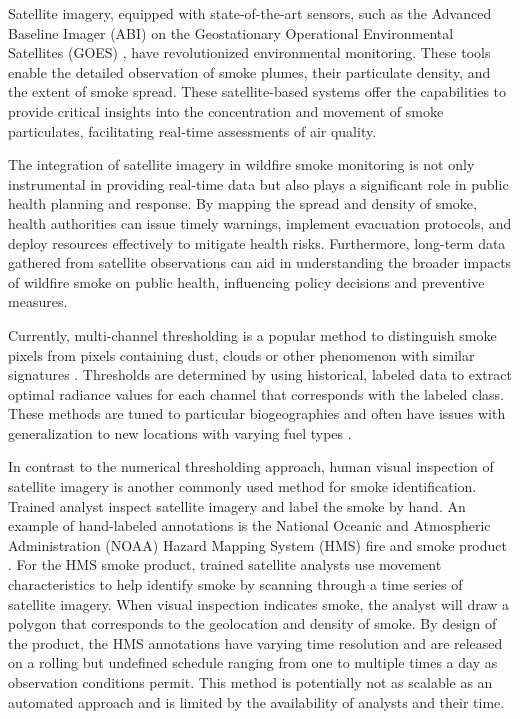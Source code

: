 \documentclass{article}
\begin{document}
Satellite imagery, equipped with state-of-the-art sensors, such as the Advanced Baseline Imager (ABI) on the Geostationary Operational Environmental Satellites (GOES) \cite{goes}, have revolutionized environmental monitoring. These tools enable the detailed observation of smoke plumes, their particulate density, and the extent of smoke spread. These satellite-based systems offer the capabilities to provide critical insights into the concentration and movement of smoke particulates, facilitating real-time assessments of air quality.

The integration of satellite imagery in wildfire smoke monitoring is not only instrumental in providing real-time data but also plays a significant role in public health planning and response. By mapping the spread and density of smoke, health authorities can issue timely warnings, implement evacuation protocols, and deploy resources effectively to mitigate health risks. Furthermore, long-term data gathered from satellite observations can aid in understanding the broader impacts of wildfire smoke on public health, influencing policy decisions and preventive measures.

Currently, multi-channel thresholding is a popular method to distinguish smoke pixels from pixels containing dust, clouds or other phenomenon with similar signatures \cite{threshold}. Thresholds are determined by using historical, labeled data to extract optimal radiance values for each channel that corresponds with the labeled class. These methods are tuned to particular biogeographies and often have issues with generalization to new locations with varying fuel types \cite{thresh_geog}.

In contrast to the numerical thresholding approach, human visual inspection of satellite imagery is another commonly used method for smoke identification. Trained analyst inspect satellite imagery and label the smoke by hand. An example of hand-labeled annotations is the National Oceanic and Atmospheric Administration (NOAA) Hazard Mapping System (HMS) fire and smoke product \cite{hms, hms_val}. For the HMS smoke product, trained satellite analysts use movement characteristics to help identify smoke by scanning through a time series of satellite imagery. When visual inspection indicates smoke, the analyst will draw a polygon that corresponds to the geolocation and density of smoke. By design of the product, the HMS annotations have varying time resolution and are released on a rolling but undefined schedule ranging from one to multiple times a day as observation conditions permit. This method is potentially not as scalable as an automated approach and is limited by the availability of analysts and their time. 
\end{document}
